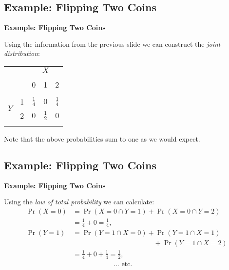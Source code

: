 \documentclass[compress]{beamer}        %
\makeatletter
\newcommand{\tcb}{\textcolor{beamer@blendedblue}}
\makeatother
\begin{document}
\subsection{Example: Flipping Two Coins}
\begin{frame}{\bf \tcb{Example: Flipping Two Coins}}

Using the information from the previous slide we can construct the \emph{joint distribution}:\\[-0.2cm]
\begin{center}
\begin{tabular}{c|c|ccc|}
\multicolumn{2}{c}{} & \multicolumn{3}{c}{$X$} \\
\cline{2-5}
&&&&\\[-0.4cm]
&&                          0 & 1 & 2 \\
\cline{2-5}
&&&&\\[-0.3cm]
\multirow{2}{*}{$Y$} & 1 & $\frac{1}{4}$ &  $0$ & $\frac{1}{4}$ \\[0.1cm]
                     & 2 & $0$           &  $\frac{1}{2}$  & $0$  \\[0.1cm]
\cline{2-5}
\multicolumn{5}{c}{}
\end{tabular}
\end{center}

Note that the above probabilities sum to one as we would expect.

\end{frame}



\subsection{Example: Flipping Two Coins}
\begin{frame}{\bf \tcb{Example: Flipping Two Coins}}

Using the \emph{law of total probability} we can calculate:\\[0.1cm]

\begin{align*}
\Pr(X=0) &= \Pr(X=0 \cap Y=1) + \Pr(X=0 \cap Y=2)\\ &= \frac{1}{4} + 0 = \frac{1}{4},\\[0.5cm]
\Pr(Y=1) &= \Pr(Y=1 \cap X=0) + \Pr(Y=1 \cap X=1) \\
 & \hspace{5cm}+ \Pr(Y=1 \cap X=2)\\
 &= \frac{1}{4} + 0 + \frac{1}{4} = \frac{1}{2},\\[0.8cm]
&\qquad\qquad\qquad\ldots \text{ etc.}
\end{align*}


\end{frame}
\end{document}
